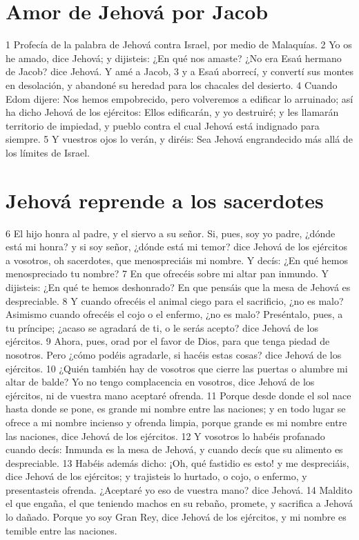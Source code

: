 

\section*{Amor de Jehová por Jacob}

1 Profecía de la palabra de Jehová contra Israel, por medio de Malaquías.
2 Yo os he amado, dice Jehová; y dijisteis: ¿En qué nos amaste? ¿No era Esaú hermano de Jacob? dice Jehová. Y amé a Jacob,
3 y a Esaú aborrecí, y convertí sus montes en desolación, y abandoné su heredad para los chacales del desierto.
4 Cuando Edom dijere: Nos hemos empobrecido, pero volveremos a edificar lo arruinado; así ha dicho Jehová de los ejércitos: Ellos edificarán, y yo destruiré; y les llamarán territorio de impiedad, y pueblo contra el cual Jehová está indignado para siempre.
5 Y vuestros ojos lo verán, y diréis: Sea Jehová engrandecido más allá de los límites de Israel.

\section*{Jehová reprende a los sacerdotes}

6 El hijo honra al padre, y el siervo a su señor. Si, pues, soy yo padre, ¿dónde está mi honra? y si soy señor, ¿dónde está mi temor? dice Jehová de los ejércitos a vosotros, oh sacerdotes, que menospreciáis mi nombre. Y decís: ¿En qué hemos menospreciado tu nombre?
7 En que ofrecéis sobre mi altar pan inmundo. Y dijisteis: ¿En qué te hemos deshonrado? En que pensáis que la mesa de Jehová es despreciable.
8 Y cuando ofrecéis el animal ciego para el sacrificio, ¿no es malo? Asimismo cuando ofrecéis el cojo o el enfermo, ¿no es malo? Preséntalo, pues, a tu príncipe; ¿acaso se agradará de ti, o le serás acepto? dice Jehová de los ejércitos.
9 Ahora, pues, orad por el favor de Dios, para que tenga piedad de nosotros. Pero ¿cómo podéis agradarle, si hacéis estas cosas? dice Jehová de los ejércitos.
10 ¿Quién también hay de vosotros que cierre las puertas o alumbre mi altar de balde? Yo no tengo complacencia en vosotros, dice Jehová de los ejércitos, ni de vuestra mano aceptaré ofrenda.
11 Porque desde donde el sol nace hasta donde se pone, es grande mi nombre entre las naciones; y en todo lugar se ofrece a mi nombre incienso y ofrenda limpia, porque grande es mi nombre entre las naciones, dice Jehová de los ejércitos.
12 Y vosotros lo habéis profanado cuando decís: Inmunda es la mesa de Jehová, y cuando decís que su alimento es despreciable.
13 Habéis además dicho: ¡Oh, qué fastidio es esto! y me despreciáis, dice Jehová de los ejércitos; y trajisteis lo hurtado, o cojo, o enfermo, y presentasteis ofrenda. ¿Aceptaré yo eso de vuestra mano? dice Jehová.
14 Maldito el que engaña, el que teniendo machos en su rebaño, promete, y sacrifica a Jehová lo dañado. Porque yo soy Gran Rey, dice Jehová de los ejércitos, y mi nombre es temible entre las naciones.

